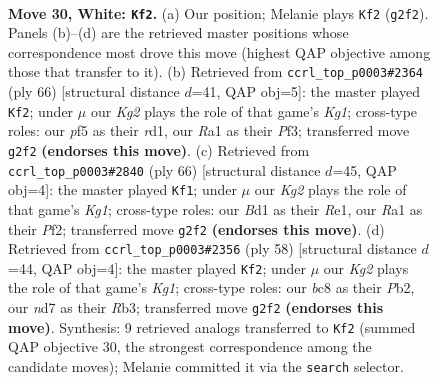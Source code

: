 \documentclass[11pt]{article}
\begin{document}
\clearpage

\begin{figure}[p]\centering
\begin{subfigure}{0.46\textwidth}\centering
\resizebox{\linewidth}{!}{%
\newchessgame
\chessboard[
  setfen={r1b4k/3n4/1p4p1/2p2p2/2P2P2/p1P3P1/P2B2K1/R2B4 w - - 9 30},
  showmover=false,
  pgfstyle=straightmove, color=movearrow, markmove={g2-f2}
]}
\caption{}
\end{subfigure}\hfill
\begin{subfigure}{0.46\textwidth}\centering
\resizebox{\linewidth}{!}{%
\newchessgame
\chessboard[
  setfen={8/1pp3pk/4n2p/P3Pp2/P7/R1B2P1P/6P1/3r2K1 w - - 0 34},
  showmover=false,
  pgfstyle=straightmove, color=movearrow, markmove={g1-f2}
]}
\caption{}
\end{subfigure}
\\[4pt]
\begin{subfigure}{0.46\textwidth}\centering
\resizebox{\linewidth}{!}{%
\newchessgame
\chessboard[
  setfen={6k1/5pp1/pnrPp2p/1p2P2P/1B6/P7/5PP1/4R1K1 w - - 0 34},
  showmover=false,
  pgfstyle=straightmove, color=movearrow, markmove={g1-f1}
]}
\caption{}
\end{subfigure}\hfill
\begin{subfigure}{0.46\textwidth}\centering
\resizebox{\linewidth}{!}{%
\newchessgame
\chessboard[
  setfen={r1b1k3/7p/2p3p1/p2n1pB1/2B5/PR3PP1/1P5P/6K1 w - - 2 30},
  showmover=false,
  pgfstyle=straightmove, color=movearrow, markmove={g1-f2}
]}
\caption{}
\end{subfigure}
\caption{\textbf{Move 30, White: \texttt{Kf2}.} (a) Our position; Melanie plays \texttt{Kf2} (\texttt{g2f2}). Panels (b)--(d) are the retrieved master positions whose correspondence most drove this move (highest QAP objective among those that transfer to it). (b) Retrieved from \texttt{ccrl\_top\_p0003\#2364} (ply 66) [structural distance $d$=41, QAP obj=5]: the master played \texttt{Kf2}; under $\mu$ our \emph{Kg2} plays the role of that game's \emph{Kg1}; cross-type roles: our \emph{p}f5 as their \emph{r}d1, our \emph{R}a1 as their \emph{P}f3; transferred move \texttt{g2f2} \textbf{(endorses this move)}. (c) Retrieved from \texttt{ccrl\_top\_p0003\#2840} (ply 66) [structural distance $d$=45, QAP obj=4]: the master played \texttt{Kf1}; under $\mu$ our \emph{Kg2} plays the role of that game's \emph{Kg1}; cross-type roles: our \emph{B}d1 as their \emph{R}e1, our \emph{R}a1 as their \emph{P}f2; transferred move \texttt{g2f2} \textbf{(endorses this move)}. (d) Retrieved from \texttt{ccrl\_top\_p0003\#2356} (ply 58) [structural distance $d$=44, QAP obj=4]: the master played \texttt{Kf2}; under $\mu$ our \emph{Kg2} plays the role of that game's \emph{Kg1}; cross-type roles: our \emph{b}c8 as their \emph{P}b2, our \emph{n}d7 as their \emph{R}b3; transferred move \texttt{g2f2} \textbf{(endorses this move)}. Synthesis: 9 retrieved analogs transferred to \texttt{Kf2} (summed QAP objective 30, the strongest correspondence among the candidate moves); Melanie committed it via the \texttt{search} selector.}
\label{fig:thought-m58}
\end{figure}
\end{document}
